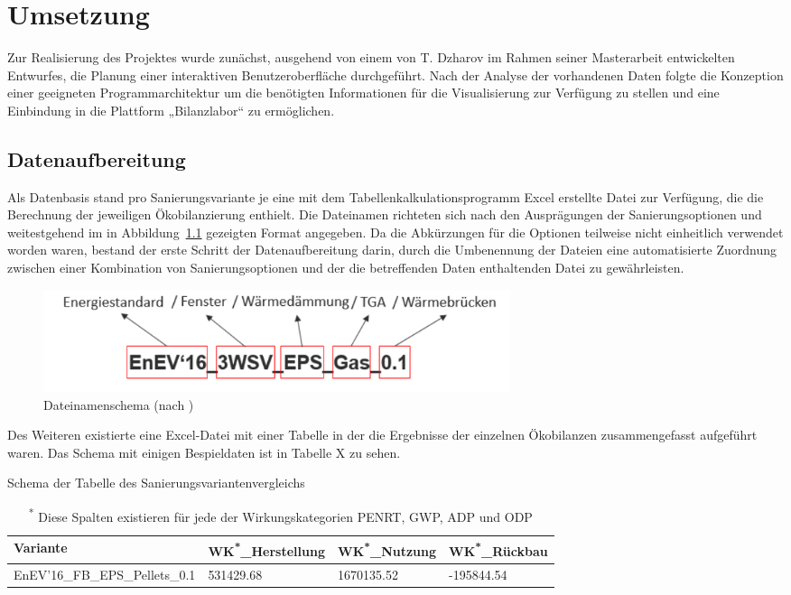 \chapter{Umsetzung}
Zur Realisierung des Projektes wurde zunächst, ausgehend von einem von T. Dzharov im Rahmen seiner Masterarbeit entwickelten Entwurfes, die Planung einer interaktiven Benutzeroberfläche durchgeführt. Nach der Analyse der vorhandenen Daten folgte die Konzeption einer geeigneten Programmarchitektur um die benötigten Informationen für die Visualisierung zur Verfügung zu stellen und eine Einbindung in die Plattform „Bilanzlabor“ zu ermöglichen.
\section{Datenaufbereitung}
Als Datenbasis stand pro Sanierungsvariante je eine mit dem Tabellenkalkulationsprogramm Excel erstellte Datei zur Verfügung, die die Berechnung der jeweiligen Ökobilanzierung enthielt. Die Dateinamen richteten sich nach den Ausprägungen der Sanierungsoptionen und weitestgehend im in Abbildung~\ref{fig:dateinamenschema} gezeigten Format angegeben. Da die Abkürzungen für die Optionen teilweise nicht einheitlich verwendet worden waren, bestand der erste Schritt der Datenaufbereitung darin, durch die Umbenennung der Dateien eine automatisierte Zuordnung zwischen einer Kombination von Sanierungsoptionen und der die betreffenden Daten enthaltenden Datei zu gewährleisten.
\begin{figure}[htbp]
	\centering
	\includegraphics[height=30mm]{figures/dateiname.png}
	\caption[Dateinamenschema]{Dateinamenschema (nach \autocite{milgram})}
	\label{fig:dateinamenschema}	
\end{figure}   
Des Weiteren existierte eine Excel-Datei mit einer Tabelle in der die Ergebnisse der einzelnen Ökobilanzen zusammengefasst aufgeführt waren. Das Schema mit einigen Bespieldaten ist in Tabelle X zu sehen.
\begin{table}[htpb]
	\caption[Example table]{Schema der Tabelle des Sanierungsvariantenvergleichs }\label{tab:wirkungsindikatoren}
	\centering
	\begin{tabular}{l l l l}
		\toprule
		Variante & WK\textsuperscript{*}\_Herstellung & WK\textsuperscript{*}\_Nutzung & WK\textsuperscript{*}\_Rückbau \\
		\midrule
		EnEV'16\_FB\_EPS\_Pellets\_0.1 & 531429.68
		 & 1670135.52 &
		  -195844.54
		  \\ \hline
		\bottomrule
	\end{tabular}
\caption*{\textsuperscript{*} Diese Spalten existieren für jede der Wirkungskategorien PENRT, GWP, ADP und ODP}
\end{table} 
